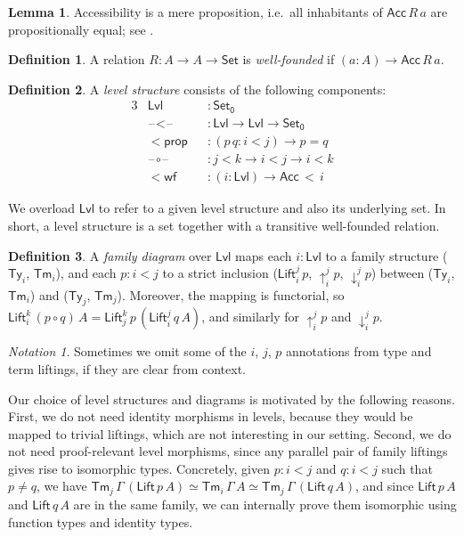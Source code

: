 \documentclass[a4paper,UKenglish,cleveref, autoref, thm-restate]{lipics-v2021}
\theoremstyle{remark}
\newtheorem{notation}{Notation}
\theoremstyle{definition}
\newtheorem{mydefinition}{Definition}
\newtheorem{mylemma}{Lemma}
\newcommand{\Set}[1]{\mathsf{Set_{#1}}}
\newcommand{\Seti}{\mathsf{Set}}
\newcommand{\Ty}{\mathsf{Ty}}
\newcommand{\Tm}{\mathsf{Tm}}
\newcommand{\blank}{\mathord{\hspace{1pt}\text{--}\hspace{1pt}}}
\newcommand{\up}{\uparrow}
\newcommand{\down}{\downarrow}
\newcommand{\Lift}{\mathsf{Lift}}
\newcommand{\Acc}{\mathsf{Acc}}
\newcommand{\Lvl}{\mathsf{Lvl}}
\begin{document}
\begin{mylemma} Accessibility is a mere proposition, i.e.\ all inhabitants of $\Acc\,R\,a$ are propositionally equal; see
  \cite[Section 10.3]{hottbook}.
\end{mylemma}

\begin{mydefinition} A relation $R : A \to A \to \Seti$ is \emph{well-founded} if $(a : A) \to \Acc\,R\,a$.
\end{mydefinition}

\begin{mydefinition} A \emph{level structure} consists of the following components:
\begin{alignat*}{3}
  & \Lvl                  &&: \Set0 \\
  & \blank\!<\!\blank     &&: \Lvl \to \Lvl \to \Set0 \\
  & \mathsf{<\!prop }     &&: (p\,q : i < j) \to p = q \\
  & \blank\!\circ\!\blank &&: j < k \to i < j \to i < k \\
  & \mathsf{<\!wf}        &&: (i : \Lvl) \to \Acc\,<\,i
\end{alignat*}
\end{mydefinition}

\noindent We overload $\Lvl$ to refer to a given level structure and also its
underlying set. In short, a level structure is a set together with a transitive
well-founded relation.

\begin{mydefinition}
A \emph{family diagram} over $\Lvl$ maps each $i : \Lvl$ to a family structure
($\Ty_i$, $\Tm_i$), and each $p : i < j$ to a strict inclusion
($\Lift_{i}^{j}\,p$, $\up_{i}^{j}p$, $\down_{i}^{j}p$) between ($\Ty_i$,
$\Tm_i$) and ($\Ty_j$, $\Tm_j$). Moreover, the mapping is functorial, so
$\Lift_{i}^{k}\,(p\circ q)\,A = \Lift_{j}^{k}\,p\,(\Lift_{i}^{j}\,q\,A)$, and
similarly for $\up_{i}^{j}p$ and $\down_{i}^{j}p$.
\end{mydefinition}

\begin{notation}
Sometimes we omit some of the $i$, $j$, $p$ annotations from type and term
liftings, if they are clear from context.
\end{notation}

Our choice of level structures and diagrams is motivated by the following
reasons. First, we do not need identity morphisms in levels, because they would
be mapped to trivial liftings, which are not interesting in our setting. Second,
we do not need proof-relevant level morphisms, since any parallel pair of family
liftings gives rise to isomorphic types. Concretely, given $p : i < j$ and $q :
i < j$ such that $p \neq q$, we have $\Tm_j\,\Gamma\,(\Lift\,p\,A) \simeq
\Tm_i\,\Gamma\,A \simeq \Tm_j\,\Gamma\,(\Lift\,q\,A)$, and since $\Lift\,p\,A$
and $\Lift\,q\,A$ are in the same family, we can internally prove them
isomorphic using function types and identity types.
\end{document}
